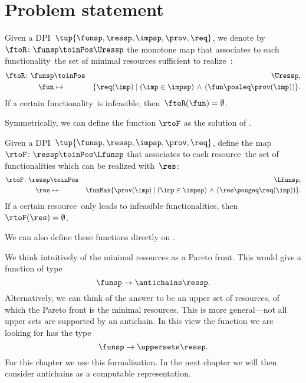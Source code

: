 

\section{Problem statement}
\label{sec:Optimization}




\begin{definition}
  \label{def:ftoR}
  Given a DPI~$\tup{ \funsp,\ressp,\impsp,\prov,\req} $,
  we denote by~$\ftoR\colon \funsp\toinPos\Uressp$ the monotone map that associates
  to each functionality~\fun the set of minimal resources sufficient to realize~\fun:
  \begin{eqnarray*}
    \ftoR\colon \funsp & \toinPos & \Uressp,\\
    \fun& \mapsto & \{\req(\imp)\mid\left(\imp\in\impsp\right)\,\wedge\,\left(\fun\posleq\prov(\imp)\right)\}.
  \end{eqnarray*}
  If a certain functionality~\fun is infeasible, then~$\ftoR(\fun)=\emptyset$.
\end{definition}

Symmetrically, we can define the function $\rtoF$ as the solution of \FixResMaxFun.

\begin{definition}
  \label{def:rtoF}
  Given a DPI~$\tup{ \funsp,\ressp,\impsp,\prov,\req}$,
  define the map~$\rtoF\colon \ressp\toinPos \Lfunsp$ that associates
  to each resource~\res the set of functionalities which can be realized with~$\res$:
  \begin{eqnarray*}
    \rtoF\colon \ressp & \toinPos & \Lfunsp,\\
    \res& \mapsto & \funMax\{\prov(\imp)\mid\left(\imp\in\impsp\right)\,\wedge\,\left(\res\posgeq\req(\imp)\right)\}.
  \end{eqnarray*}
  If a certain resource~\res only leads to infeasible functionalities, then~$\rtoF(\res)=\emptyset$.
\end{definition}

We can also define these functions directly on \DP.




We think intuitively of the minimal resources as a Pareto front. This would give a function of type
\begin{equation}
    \funsp \to \antichains\ressp.
\end{equation}
Alternatively, we can think of the answer to be an upper set of resources, of which the Pareto front is the minimal resources. This is more general---not all upper sets are supported by an antichain. In this view the function we are looking for has the type
\begin{equation}
    \funsp \to \uppersets\ressp.
\end{equation}
For this chapter we use this formalization. In the next chapter we will then consider antichains as a computable representation.

